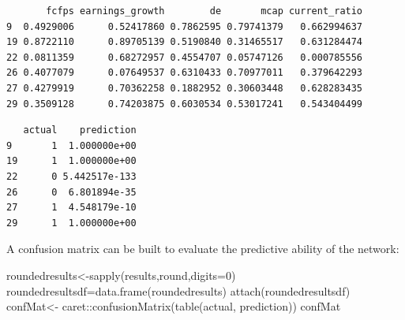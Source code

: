 \documentclass[
  letterpaper,
  DIV=11,
  numbers=noendperiod,
  oneside]{scrartcl}
\newenvironment{Shaded}{\begin{snugshade}}{\end{snugshade}}
\newcommand{\AttributeTok}[1]{\textcolor[rgb]{0.40,0.45,0.13}{#1}}
\newcommand{\DecValTok}[1]{\textcolor[rgb]{0.68,0.00,0.00}{#1}}
\newcommand{\FunctionTok}[1]{\textcolor[rgb]{0.28,0.35,0.67}{#1}}
\newcommand{\NormalTok}[1]{\textcolor[rgb]{0.00,0.23,0.31}{#1}}
\newcommand{\OtherTok}[1]{\textcolor[rgb]{0.00,0.23,0.31}{#1}}
\newcommand{\SpecialCharTok}[1]{\textcolor[rgb]{0.37,0.37,0.37}{#1}}
\begin{document}
\begin{verbatim}
       fcfps earnings_growth        de       mcap current_ratio
9  0.4929006      0.52417860 0.7862595 0.79741379   0.662994637
19 0.8722110      0.89705139 0.5190840 0.31465517   0.631284474
22 0.0811359      0.68272957 0.4554707 0.05747126   0.000785556
26 0.4077079      0.07649537 0.6310433 0.70977011   0.379642293
27 0.4279919      0.70362258 0.1882952 0.30603448   0.628283435
29 0.3509128      0.74203875 0.6030534 0.53017241   0.543404499
\end{verbatim}

\begin{Shaded}
\end{Shaded}

\begin{verbatim}
   actual    prediction
9       1  1.000000e+00
19      1  1.000000e+00
22      0 5.442517e-133
26      0  6.801894e-35
27      1  4.548179e-10
29      1  1.000000e+00
\end{verbatim}

A confusion matrix can be built to evaluate the predictive ability of
the network:

\begin{Shaded}
\begin{Highlighting}[]
\NormalTok{roundedresults}\OtherTok{\textless{}{-}}\FunctionTok{sapply}\NormalTok{(results,round,}\AttributeTok{digits=}\DecValTok{0}\NormalTok{)}
\NormalTok{roundedresultsdf}\OtherTok{=}\FunctionTok{data.frame}\NormalTok{(roundedresults)}
\FunctionTok{attach}\NormalTok{(roundedresultsdf)}
\NormalTok{confMat}\OtherTok{\textless{}{-}}\NormalTok{ caret}\SpecialCharTok{::}\FunctionTok{confusionMatrix}\NormalTok{(}\FunctionTok{table}\NormalTok{(actual, prediction))}
\NormalTok{confMat}
\end{Highlighting}
\end{Shaded}
\end{document}
